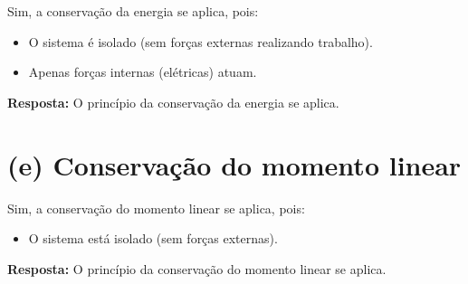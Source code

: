 \documentclass[a4paper,12pt]{article}
\begin{document}
\begin{flushleft}
Sim, a conservação da energia se aplica, pois:

\begin{itemize}
    \item O sistema é isolado (sem forças externas realizando trabalho).
    \item Apenas forças internas (elétricas) atuam.
\end{itemize}

\textbf{Resposta:} O princípio da conservação da energia se aplica.

\section*{(e) Conservação do momento linear}

Sim, a conservação do momento linear se aplica, pois:

\begin{itemize}
    \item O sistema está isolado (sem forças externas).
\end{itemize}

\textbf{Resposta:} O princípio da conservação do momento linear se aplica.
\end{flushleft}
\end{document}
